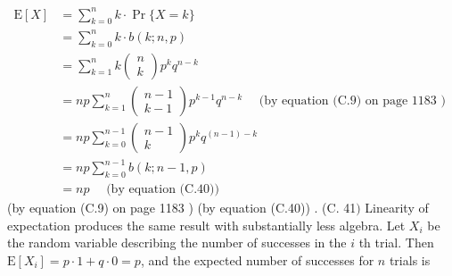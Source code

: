 \documentclass[lang=cn,newtx,10pt,scheme=chinese]{elegantbook}
\begin{document}
$$
\begin{aligned}
\mathrm{E}[X] & =\sum_{k=0}^n k \cdot \operatorname{Pr}\{X=k\} \\
& =\sum_{k=0}^n k \cdot b(k ; n, p) \\
& =\sum_{k=1}^n k\left(\begin{array}{l}
n \\
k
\end{array}\right) p^k q^{n-k} \\
& =n p \sum_{k=1}^n\left(\begin{array}{c}
n-1 \\
k-1
\end{array}\right) p^{k-1} q^{n-k} \quad \text { (by equation (C.9) on page } 1183 \text { ) } \\
& =n p \sum_{k=0}^{n-1}\left(\begin{array}{c}
n-1 \\
k
\end{array}\right) p^k q^{(n-1)-k} \quad \\
& =n p \sum_{k=0}^{n-1} b(k ; n-1, p) \\
& =n p \quad \text { (by equation (C.40)) }
\end{aligned}
$$
(by equation (C.9) on page 1183 )
(by equation (C.40)) .
(C. 41$)$
Linearity of expectation produces the same result with substantially less algebra. Let $X_i$ be the random variable describing the number of successes in the $i$ th trial. Then $\mathrm{E}\left[X_i\right]=p \cdot 1+q \cdot 0=p$, and the expected number of successes for $n$ trials is
\end{document}
